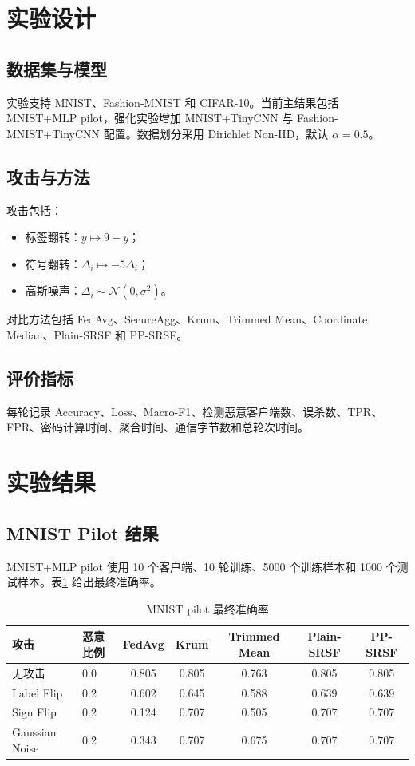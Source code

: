 \documentclass[UTF8,a4paper,zihao=-4]{ctexart}
\begin{document}
\section{实验设计}
\subsection{数据集与模型}
实验支持 MNIST、Fashion-MNIST 和 CIFAR-10。当前主结果包括 MNIST+MLP pilot，强化实验增加 MNIST+TinyCNN 与 Fashion-MNIST+TinyCNN 配置。数据划分采用 Dirichlet Non-IID，默认 $\alpha=0.5$。

\subsection{攻击与方法}
攻击包括：
\begin{itemize}
  \item 标签翻转：$y\mapsto 9-y$；
  \item 符号翻转：$\Delta_i\mapsto -5\Delta_i$；
  \item 高斯噪声：$\Delta_i\sim \mathcal{N}(0,\sigma^2)$。
\end{itemize}
对比方法包括 FedAvg、SecureAgg、Krum、Trimmed Mean、Coordinate Median、Plain-SRSF 和 PP-SRSF。

\subsection{评价指标}
每轮记录 Accuracy、Loss、Macro-F1、检测恶意客户端数、误杀数、TPR、FPR、密码计算时间、聚合时间、通信字节数和总轮次时间。

\section{实验结果}
\subsection{MNIST Pilot 结果}
MNIST+MLP pilot 使用 10 个客户端、10 轮训练、5000 个训练样本和 1000 个测试样本。表\ref{tab:mnist-pilot} 给出最终准确率。

\begin{table}[h]
\centering
\caption{MNIST pilot 最终准确率}
\label{tab:mnist-pilot}
\begin{tabular}{llccccc}
\toprule
攻击 & 恶意比例 & FedAvg & Krum & Trimmed Mean & Plain-SRSF & PP-SRSF\\
\midrule
无攻击 & 0.0 & 0.805 & 0.805 & 0.763 & 0.805 & 0.805\\
Label Flip & 0.2 & 0.602 & 0.645 & 0.588 & 0.639 & 0.639\\
Sign Flip & 0.2 & 0.124 & 0.707 & 0.505 & 0.707 & 0.707\\
Gaussian Noise & 0.2 & 0.343 & 0.707 & 0.675 & 0.707 & 0.707\\
\bottomrule
\end{tabular}
\end{table}
\end{document}
